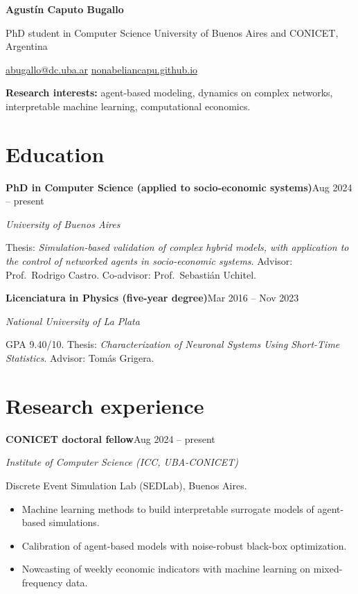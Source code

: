 \documentclass[10pt]{article}
\newcommand{\entry}[3]{{\bfseries #1}\hfill{\color{muted}\small #3}\par{\color{accent}\itshape #2}\par}
\begin{document}
\color{bodytext}

{\fontsize{24}{28}\selectfont\bfseries\color{accent} Agustín Caputo Bugallo}\par
\vspace{3pt}
{\large PhD student in Computer Science \textperiodcentered{} University of Buenos Aires and CONICET, Argentina}\par
\vspace{3pt}
{\color{muted}\href{mailto:abugallo@dc.uba.ar}{abugallo@dc.uba.ar} \quad\textbar\quad \href{https://nonabeliancapu.github.io}{nonabeliancapu.github.io}}\par
\vspace{4pt}
\textbf{Research interests:} agent-based modeling, dynamics on complex networks, interpretable machine learning, computational economics.

\section{Education}

\entry{PhD in Computer Science (applied to socio-economic systems)}{University of Buenos Aires}{Aug 2024 -- present}
Thesis: \emph{Simulation-based validation of complex hybrid models, with application to the control of networked agents in socio-economic systems}. Advisor: Prof.~Rodrigo Castro. Co-advisor: Prof.~Sebastián Uchitel.

\medskip
\entry{Licenciatura in Physics (five-year degree)}{National University of La Plata}{Mar 2016 -- Nov 2023}
GPA 9.40/10. Thesis: \emph{Characterization of Neuronal Systems Using Short-Time Statistics}. Advisor: Tomás Grigera.

\section{Research experience}

\entry{CONICET doctoral fellow}{Institute of Computer Science (ICC, UBA-CONICET)}{Aug 2024 -- present}
Discrete Event Simulation Lab (SEDLab), Buenos Aires.
\begin{itemize}
  \item Machine learning methods to build interpretable surrogate models of agent-based simulations.
  \item Calibration of agent-based models with noise-robust black-box optimization.
  \item Nowcasting of weekly economic indicators with machine learning on mixed-frequency data.
\end{itemize}
\end{document}
